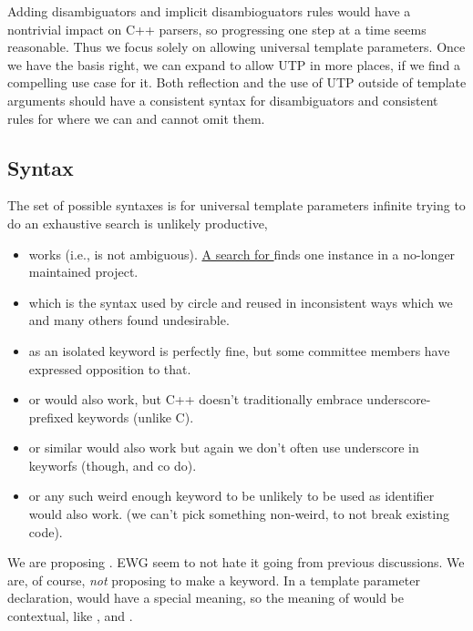 \documentclass{wg21}
\begin{document}
Adding disambiguators and implicit disambioguators rules would have a nontrivial impact on C++ parsers, so progressing one step at a time seems reasonable.
Thus we focus solely on allowing universal template parameters. Once we have the basis right, we can expand to
allow UTP in more places, if we find a compelling use case for it. Both reflection and the use of UTP outside of template arguments should have a consistent syntax for disambiguators and consistent rules for where we can and cannot omit them.

\subsection{Syntax}

The set of possible syntaxes is for universal template parameters infinite trying to do an exhaustive search is unlikely productive,

\begin{itemize}

\item {} works (i.e., is not ambiguous). \href{https://tinyurl.com/pth8v9p7}{A search for }
finds one instance in a no-longer maintained project.

\item {} which is the syntax used by circle and  reused  in inconsistent ways
which we and many others found undesirable.

\item {} as an isolated keyword is perfectly fine, but some committee members have expressed opposition to that.

\item {} or  would also work, but C++ doesn't traditionally embrace underscore-prefixed keywords (unlike C).

\item {} or similar would also work but again we don't often use underscore in keyworfs (though,  and co do).

\item {} or any such weird enough keyword to be unlikely to be used as identifier would also work. (we can't pick something non-weird, to not break existing code).

\end{itemize}

We are proposing . EWG seem to not hate it going from previous discussions.
We are, of course, \emph{not} proposing to make  a keyword.
In a template parameter declaration,  would have a special meaning, so the meaning of  would be
contextual, like ,  and .
\end{document}
